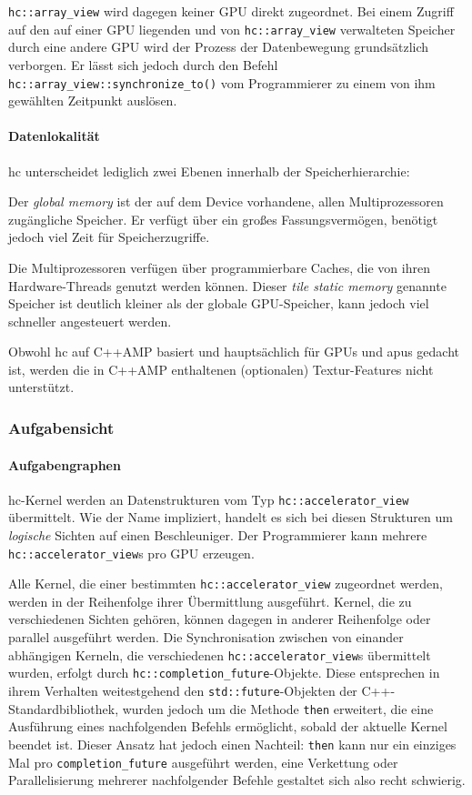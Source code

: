 \texttt{hc::array\_view} wird dagegen keiner GPU direkt zugeordnet. Bei einem
Zugriff auf den auf einer GPU liegenden und von \texttt{hc::array\_view}
verwalteten Speicher durch eine andere GPU wird der Prozess der Datenbewegung
grundsätzlich verborgen. Er lässt sich jedoch durch den Befehl
\texttt{hc::array\_view::synchronize\_to()} vom Programmierer zu einem von ihm
gewählten Zeitpunkt auslösen.

\paragraph{Datenlokalität}

\gls{hc} unterscheidet lediglich zwei Ebenen innerhalb der Speicherhierarchie:

Der \textit{global memory} ist der auf dem Device vorhandene, allen
Multiprozessoren zugängliche Speicher. Er verfügt über ein großes
Fassungsvermögen, benötigt jedoch viel Zeit für Speicherzugriffe.

Die Multiprozessoren verfügen über programmierbare Caches, die von ihren
Hardware-Threads genutzt werden können. Dieser \textit{tile static memory}
genannte Speicher ist deutlich kleiner als der globale GPU-Speicher, kann jedoch
viel schneller angesteuert werden.

Obwohl \gls{hc} auf C++AMP basiert und hauptsächlich für GPUs und \gls{apu}s
gedacht ist, werden die in C++AMP enthaltenen (optionalen) Textur-Features nicht
unterstützt.

\subsubsection{Aufgabensicht}

\paragraph{Aufgabengraphen}

\gls{hc}-Kernel werden an Datenstrukturen vom Typ \texttt{hc::accelerator\_view}
übermittelt. Wie der Name impliziert, handelt es sich bei diesen Strukturen um
\textit{logische} Sichten auf einen Beschleuniger. Der Programmierer kann
mehrere \texttt{hc::accelerator\_view}s pro GPU erzeugen.

Alle Kernel, die einer bestimmten \texttt{hc::accelerator\_view} zugeordnet
werden, werden in der Reihenfolge ihrer Übermittlung ausgeführt. Kernel, die
zu verschiedenen Sichten gehören, können dagegen in anderer Reihenfolge oder
parallel ausgeführt werden. Die Synchronisation zwischen von einander abhängigen
Kerneln, die verschiedenen \texttt{hc::accelerator\_view}s übermittelt wurden,
erfolgt durch \texttt{hc::completion\_future}-Objekte. Diese entsprechen in
ihrem Verhalten weitestgehend den \texttt{std::future}-Objekten der
C++-Standardbibliothek, wurden jedoch um die Methode \texttt{then} erweitert,
die eine Ausführung eines nachfolgenden Befehls ermöglicht, sobald der aktuelle
Kernel beendet ist. Dieser Ansatz hat jedoch einen Nachteil: \texttt{then}
kann nur ein einziges Mal pro \texttt{completion\_future} ausgeführt werden,
eine Verkettung oder Parallelisierung mehrerer nachfolgender Befehle gestaltet
sich also recht schwierig.

